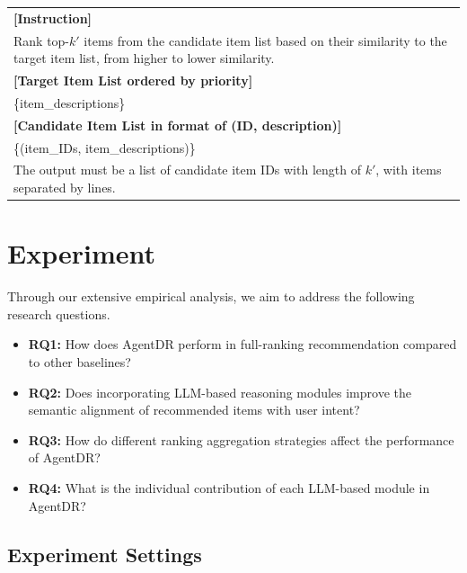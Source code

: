 \begin{promptbox}
\small
\begin{tabularx}{\linewidth}{X}
\toprule
\textbf{[Instruction]}\\
Rank top-\emph{$k'$} items from the candidate item list based on their similarity to the target item list, from higher to lower similarity.\\[0.4em]
\textbf{[Target Item List ordered by priority]}\\
\{item\_descriptions\}\\[0.4em]
\textbf{[Candidate Item List in format of (ID, description)]}\\
\{(item\_IDs, item\_descriptions)\}\\[0.4em]
The output must be a list of candidate item IDs with length of \emph{$k'$}, with items separated by lines.\\
\bottomrule
\end{tabularx}
\end{promptbox}
\label{app:tab:dualrerank}



\FloatBarrier
\section{Experiment}
Through our extensive empirical analysis, we aim to address the following research questions.
\begin{itemize}[left=0pt]
    \item \textbf{RQ1:} How does AgentDR perform in full-ranking recommendation compared to other baselines?
    \item \textbf{RQ2:} Does incorporating LLM-based reasoning modules improve the semantic alignment of recommended items with user intent?
    \item \textbf{RQ3:} How do different ranking aggregation strategies affect the performance of AgentDR?
    \item \textbf{RQ4:} What is the individual contribution of each LLM-based module in AgentDR?
\end{itemize}
\subsection{Experiment Settings}

